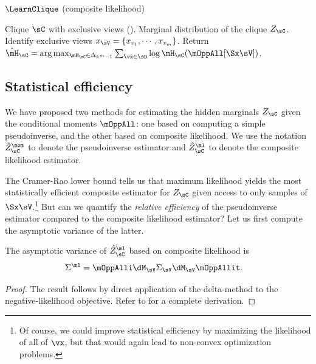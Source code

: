 \begin{algorithm}
  \caption{$\LearnClique$ (composite likelihood)}
  \label{algo:piecewise}
  \begin{algorithmic}
    \REQUIRE Clique $\sC$ with exclusive views ().
    \ENSURE Marginal distribution of the clique $Z_\sC$.
\STATE Identify exclusive views $x_\sV = \{x_{v_1}, \cdots, x_{v_m}\}$.
\STATE Return $\hat \mH_\sC = \arg\max_{\mH_\sC \in \Delta_{k^m-1}} \sum_{\vx \in \sD} \log \mH_\sC(\mOppAll[\Sx \sV])$.
  \end{algorithmic}
\end{algorithm}

\subsection{Statistical efficiency}

We have proposed two methods for estimating the hidden marginals $Z_\sC$ given
the conditional moments $\mOppAll$: one based on computing a simple pseudoinverse,
and the other based on composite likelihood.
We use the notation $\hat Z^\mom_\sC$ to denote the pseudoinverse
  estimator and $\hat Z^\ml_\sC$ to denote the composite likelihood
  estimator.

The Cramer-Rao lower bound tells us that maximum likelihood yields
the most statistically efficient composite estimator for $Z_\sC$
given access to only samples of $\Sx\sV$.\footnote{Of course, we could improve statistical efficiency
by maximizing the likelihood of all of $\vx$, but that would again lead to non-convex optimization problems.}
But can we quantify the \emph{relative efficiency} of the pseudoinverse estimator
compared to the composite likelihood estimator?
Let us first compute the asymptotic variance of the latter.

\begin{lemma}
  \label{lem:pw-variance}
  The asymptotic variance of $\hat Z^\ml_{\sC}$ based on composite likelihood is
  \begin{align*}
    \Sigma^{\ml} &= \mOppAlli \dM_\sV \Sigma_\sV \dM_\sV \mOppAllit.
  \end{align*}
\end{lemma}
\begin{proof}
  The result follows by direct application of the delta-method
  \cite{vaart98asymptotic} to the negative-likelihood objective. Refer to
   for a complete derivation.
\end{proof}

